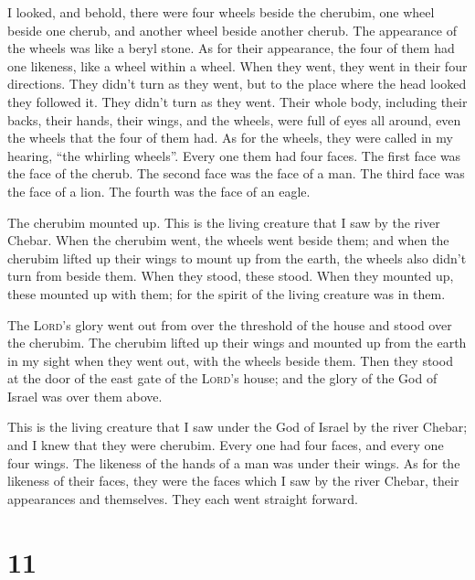  I looked, and behold, there were four wheels beside the
cherubim, one wheel beside one cherub, and another wheel beside another
cherub. The appearance of the wheels was like a beryl stone.
 As for their appearance, the four of them had one
likeness, like a wheel within a wheel.  When they went,
they went in their four directions. They didn't turn as they went, but
to the place where the head looked they followed it. They didn't turn as
they went.  Their whole body, including their backs,
their hands, their wings, and the wheels, were full of eyes all around,
even the wheels that the four of them had.  As for the
wheels, they were called in my hearing, ``the whirling wheels''.
 Every one them had four faces. The first face was the
face of the cherub. The second face was the face of a man. The third
face was the face of a lion. The fourth was the face of an eagle.

 The cherubim mounted up. This is the living creature
that I saw by the river Chebar.  When the cherubim went,
the wheels went beside them; and when the cherubim lifted up their wings
to mount up from the earth, the wheels also didn't turn from beside
them.  When they stood, these stood. When they mounted
up, these mounted up with them; for the spirit of the living creature
was in them.

 The \textsc{Lord}'s glory went out from over the
threshold of the house and stood over the cherubim.  The
cherubim lifted up their wings and mounted up from the earth in my sight
when they went out, with the wheels beside them. Then they stood at the
door of the east gate of the \textsc{Lord}'s house; and the glory of the
God of Israel was over them above.

 This is the living creature that I saw under the God of
Israel by the river Chebar; and I knew that they were cherubim.
 Every one had four faces, and every one four wings. The
likeness of the hands of a man was under their wings.  As
for the likeness of their faces, they were the faces which I saw by the
river Chebar, their appearances and themselves. They each went straight
forward.

\hypertarget{section-10}{%
\section{11}\label{section-10}}

